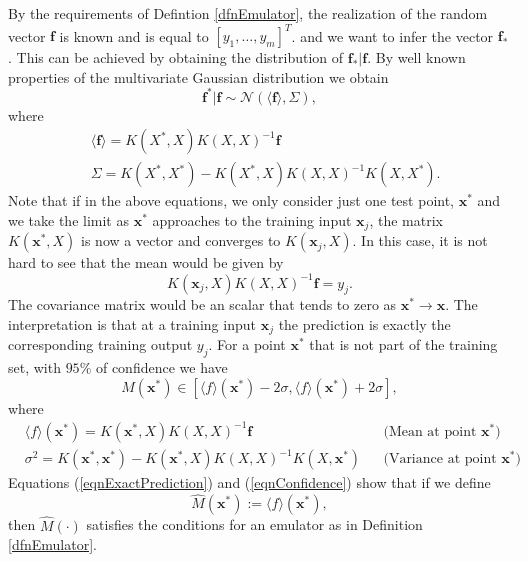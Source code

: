 \documentclass[12pt]{book}
\newcommand{\x}{\textbf{x}}
\begin{document}
By the requirements of Defintion \ref{dfnEmulator},
 the realization of the random vector $\textbf{f}$ is known and is equal to $[y_{1},\ldots,y_{m}]^{T}$.  
and we want to  infer  the vector $\textbf{f}_{*}$.
This can be achieved by obtaining the distribution of $\textbf{f}_{*}|\textbf{f}$. By well known properties
of the multivariate Gaussian distribution we  obtain  \cite{lifshits2013gaussian}
\begin{equation}\label{eqnformulameancovariance}
\textbf{f}^{*}|\textbf{f}\sim\mathscr{N}(\langle\textbf{f}\rangle,\Sigma),
\end{equation}
where
\begin{align*}
&\langle\textbf{f}\rangle=K(X^{*},X)K(X,X)^{-1}\textbf{f}\\
&\Sigma=K(X^{*},X^{*})-K(X^{*},X)K(X,X)^{-1}K(X,X^{*}).
\end{align*}
Note that  if in the above equations, we only consider just one  test point, $\x^{*}$ and
we take the limit as $\x^{*}$ approaches  to the training input $\x_{j}$,
 the matrix
$K(\x^{*},X)$ is now a vector and  converges to  $K(\x_{j},X)$. In this case, it is not hard 
to see that the mean
would be given by 
\begin{equation}\label{eqnExactPrediction}
K(\x_{j},X)K(X,X)^{-1}\textbf{f}=y_{j}.
\end{equation} 
The covariance matrix would 
be an scalar  that tends to zero as $\x^{*}\rightarrow \x$. The interpretation is that 
at a training input $\x_{j}$ the prediction is exactly the  corresponding training output $y_{j}$. 
For a point $\textbf{x}^{*}$ that is not part of the training set, with $95\%$ of confidence we have
\begin{equation}\label{eqnConfidence}
M(\x^{*})\in [\langle f \rangle(\x^{*})-2\sigma,\langle f\rangle(\x^{*})+2\sigma],
\end{equation}
where
\begin{align*}
&\langle f\rangle(\x^{*})=K(\textbf{x}^{*},X)K(X,X)^{-1}\textbf{f}&&\text{(Mean at point $\x^{*}$)}  \\
&\sigma^{2}=K(\textbf{x}^{*},\textbf{x}^{*})-
K(\textbf{x}^{*},X)K(X,X)^{-1}K(X,\textbf{x}^{*}) &&\text{(Variance at point $\x^{*}$)}.
\end{align*}
Equations (\ref{eqnExactPrediction}) and (\ref{eqnConfidence})  show that if we define 
\begin{equation}\label{eqnDefEmulator}
\widehat{M}(\x^{*}):=\langle f\rangle(\x^{*}), 
\end{equation}
then $\widehat{M}(\cdot)$ satisfies the 
conditions for an emulator as in Definition \ref{dfnEmulator}.
\end{document}
